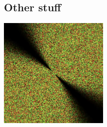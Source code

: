 \begin{appendices}
\section{Other stuff}
\begin{minipage}{1\textwidth}
    \centering
    \includegraphics[width=0.4\textwidth]{"images/phillips_spectrum.png"}
    \label{fig:phillips_spectrum}
\end{minipage}

%
%



\end{appendices}
